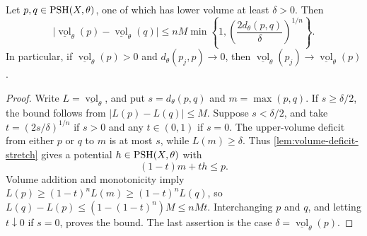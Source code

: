 \begin{proposition}\label{prop:model-lower-volume-modulus}
Let $p,q\in\mathrm{PSH}(X,\theta)$, one of which has lower volume at least $\delta>0$. Then
\begin{equation}\label{eq:model-lower-volume-modulus}
 \bigl|\underline{\operatorname{vol}}_\theta(p)
       -\underline{\operatorname{vol}}_\theta(q)\bigr|
 \leq nM\min\left\{1,
       \left(\frac{2d_\theta(p,q)}\delta\right)^{1/n}\right\}.
\end{equation}
In particular, if $\underline{\operatorname{vol}}_\theta(p)>0$ and $d_\theta(p_j,p)\to0$, then $\underline{\operatorname{vol}}_\theta(p_j)\to\underline{\operatorname{vol}}_\theta(p)$.
\end{proposition}
\begin{proof}
Write $L=\underline{\operatorname{vol}}_\theta$, and put $s=d_\theta(p,q)$ and $m=\max(p,q)$. If $s\geq\delta/2$, the bound follows from $|L(p)-L(q)|\leq M$. Suppose $s<\delta/2$, and take $t=(2s/\delta)^{1/n}$ if $s>0$ and any $t\in(0,1)$ if $s=0$. The upper-volume deficit from either $p$ or $q$ to $m$ is at most $s$, while $L(m)\geq\delta$. Thus \cref{lem:volume-deficit-stretch} gives a potential $h\in\mathrm{PSH}(X,\theta)$ with
\[
 (1-t)m+th\leq p.
\]
Volume addition and monotonicity imply $L(p)\geq(1-t)^nL(m)\geq(1-t)^nL(q)$, so $L(q)-L(p)\leq(1-(1-t)^n)M\leq nMt$. Interchanging $p$ and $q$, and letting $t\downarrow0$ if $s=0$, proves the bound. The last assertion is the case $\delta=\underline{\operatorname{vol}}_\theta(p)$.
\end{proof}

